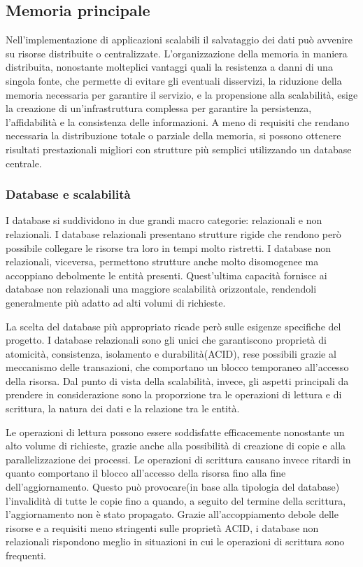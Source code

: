 \clearpage
\subsection{Memoria principale}

	

Nell’implementazione di applicazioni scalabili il salvataggio dei dati può avvenire su risorse distribuite o centralizzate. L’organizzazione della memoria in maniera distribuita, nonostante molteplici vantaggi quali la resistenza a danni di una singola fonte, che permette di evitare gli eventuali disservizi, la riduzione della memoria necessaria per garantire il servizio, e la propensione alla scalabilità, esige la creazione di un’infrastruttura complessa per garantire la persistenza, l’affidabilità e la consistenza delle informazioni. A meno di requisiti che rendano necessaria la distribuzione totale o parziale della memoria, si possono ottenere risultati prestazionali migliori con strutture più semplici utilizzando un database centrale. 

\subsubsection{ Database e scalabilità}

I database si suddividono in due grandi macro categorie: relazionali e non relazionali. I database relazionali presentano strutture rigide che rendono però possibile collegare le risorse tra loro in tempi molto ristretti. I database non relazionali, viceversa, permettono strutture anche molto disomogenee ma accoppiano debolmente le entità presenti. Quest’ultima capacità fornisce ai database non relazionali una maggiore scalabilità orizzontale, rendendoli generalmente più adatto ad alti volumi di richieste.

La scelta del database più appropriato ricade però sulle esigenze specifiche del progetto. 
I database relazionali sono gli unici che garantiscono proprietà di atomicità, consistenza, isolamento e durabilità(ACID), rese possibili grazie al meccanismo delle transazioni, che comportano un blocco temporaneo all’accesso della risorsa. 
Dal punto di vista della scalabilità, invece, gli aspetti principali da prendere in considerazione sono la proporzione tra le operazioni di lettura e di scrittura, la natura dei dati e la relazione tra le entità. 

Le operazioni di lettura possono essere soddisfatte efficacemente nonostante un alto volume di richieste, grazie anche alla possibilità di creazione di copie e alla parallelizzazione dei processi.
Le operazioni di scrittura causano invece ritardi in quanto comportano il blocco all’accesso della risorsa fino alla fine dell’aggiornamento. Questo può provocare(in base alla tipologia del database) l’invalidità di tutte le copie fino a quando, a seguito del termine della scrittura, l’aggiornamento non è stato propagato. 
Grazie all’accoppiamento debole delle risorse e a requisiti meno stringenti sulle proprietà ACID, i database non relazionali rispondono meglio in situazioni in cui le operazioni di scrittura sono frequenti. 

